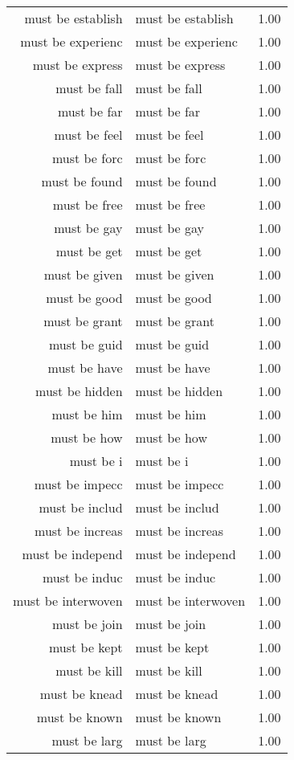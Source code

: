 \begin{table}[ht]
\begin{tabular}{rlr}
  must be establish & must be establish & 1.00 \\ 
  must be experienc & must be experienc & 1.00 \\ 
  must be express & must be express & 1.00 \\ 
  must be fall & must be fall & 1.00 \\ 
  must be far & must be far & 1.00 \\ 
  must be feel & must be feel & 1.00 \\ 
  must be forc & must be forc & 1.00 \\ 
  must be found & must be found & 1.00 \\ 
  must be free & must be free & 1.00 \\ 
  must be gay & must be gay & 1.00 \\ 
  must be get & must be get & 1.00 \\ 
  must be given & must be given & 1.00 \\ 
  must be good & must be good & 1.00 \\ 
  must be grant & must be grant & 1.00 \\ 
  must be guid & must be guid & 1.00 \\ 
  must be have & must be have & 1.00 \\ 
  must be hidden & must be hidden & 1.00 \\ 
  must be him & must be him & 1.00 \\ 
  must be how & must be how & 1.00 \\ 
  must be i & must be i & 1.00 \\ 
  must be impecc & must be impecc & 1.00 \\ 
  must be includ & must be includ & 1.00 \\ 
  must be increas & must be increas & 1.00 \\ 
  must be independ & must be independ & 1.00 \\ 
  must be induc & must be induc & 1.00 \\ 
  must be interwoven & must be interwoven & 1.00 \\ 
  must be join & must be join & 1.00 \\ 
  must be kept & must be kept & 1.00 \\ 
  must be kill & must be kill & 1.00 \\ 
  must be knead & must be knead & 1.00 \\ 
  must be known & must be known & 1.00 \\ 
  must be larg & must be larg & 1.00 \\ 

\end{tabular}
\end{table}
